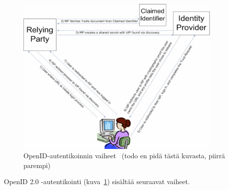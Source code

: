 \documentclass[finnish,gradu]{tktltiki}
\begin{document}
  \begin{figure}
    \centering
    \includegraphics[width=0.9\textwidth]{images/openid_flow_recordon06.jpg}
    \caption{OpenID-autentikoinnin vaiheet~\cite{openid_recordon_2009} (todo en pidä tästä kuvasta, piirrä parempi)}
    \label{fig:basic_openid_flow}
  \end{figure}

  OpenID 2.0 -autentikointi (kuva~\ref{fig:basic_openid_flow}) sisältää seuraavat vaiheet.

  \newenvironment{testiasdf}
  {\begin{description}
    \setlength{\itemsep}{6pt}
    \setlength{\parskip}{6pt}
    \setlength{\parsep}{0pt}}
  {\end{description}}
\end{document}
